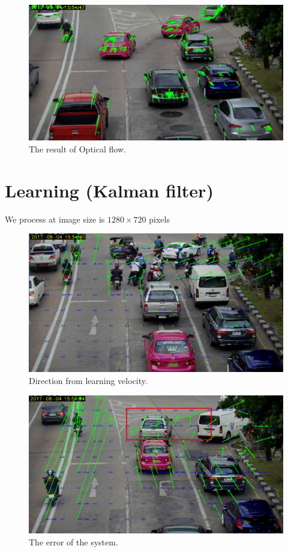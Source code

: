 \begin{figure}[t]
	\centering
	\includegraphics[width=6in]{figures/opticalflowExample.jpg}  
	\caption[The result of Optical flow]{The result of Optical flow.}
	\label{fig:opticalflowExample}
\end{figure}

\section{Learning (Kalman filter)}
We process at image size is $1280 \times 720$ pixels 

\begin{figure}[t]
	\centering
	\includegraphics[width=6in]{figures/kalmanResult.jpg}  
	\caption[Direction from learning velocity]{Direction from learning velocity.}
	\label{fig:kalmanResult}
\end{figure}

\begin{figure}[t]
	\centering
	\includegraphics[width=6in]{figures/errorfromOF.jpg}  
	\caption[The error of the system]{The error of the system.}
	\label{fig:errorfromOF}
\end{figure}

\FloatBarrier

